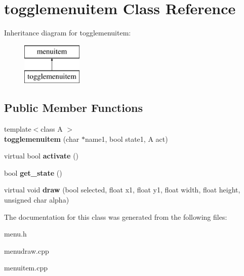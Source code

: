 \hypertarget{classtogglemenuitem}{\section{togglemenuitem Class Reference}
\label{classtogglemenuitem}
}
Inheritance diagram for togglemenuitem\-:\begin{figure}[H]
\begin{center}
\leavevmode
\includegraphics[height=2.000000cm]{classtogglemenuitem}
\end{center}
\end{figure}
\subsection*{Public Member Functions}
\begin{DoxyCompactItemize}
\item 
\hypertarget{classtogglemenuitem_a1e2cbb2a0b302aa58569aea49eef830c}{{\footnotesize template$<$class A $>$ }\\{\bfseries togglemenuitem} (char $\ast$name1, bool state1, A act)}\label{classtogglemenuitem_a1e2cbb2a0b302aa58569aea49eef830c}

\item 
\hypertarget{classtogglemenuitem_a43141175b333f427c408255708609f4d}{virtual bool {\bfseries activate} ()}\label{classtogglemenuitem_a43141175b333f427c408255708609f4d}

\item 
\hypertarget{classtogglemenuitem_a56ba78d7ca02ff2ef4a2e0b6e8782ebc}{bool {\bfseries get\-\_\-state} ()}\label{classtogglemenuitem_a56ba78d7ca02ff2ef4a2e0b6e8782ebc}

\item 
\hypertarget{classtogglemenuitem_a9245f46eca199c9d5b2c8bc494c1b737}{virtual void {\bfseries draw} (bool selected, float x1, float y1, float width, float height, unsigned char alpha)}\label{classtogglemenuitem_a9245f46eca199c9d5b2c8bc494c1b737}

\end{DoxyCompactItemize}


The documentation for this class was generated from the following files\-:\begin{DoxyCompactItemize}
\item 
menu.\-h\item 
menudraw.\-cpp\item 
menuitem.\-cpp\end{DoxyCompactItemize}
